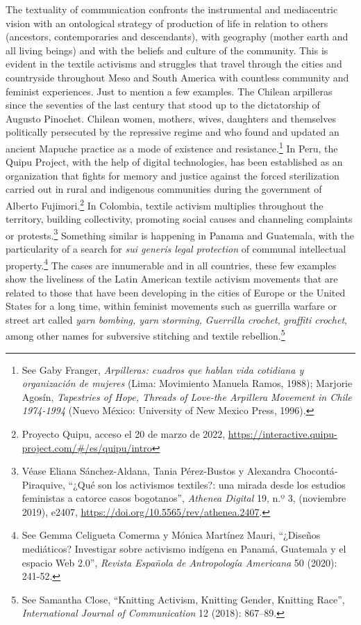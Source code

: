 \documentclass{tufte-handout}
\begin{document}
The textuality of communication confronts the instrumental and
mediacentric vision with an ontological strategy of production of life
in relation to others (ancestors, contemporaries and descendants), with
geography (mother earth and all living beings) and with the beliefs and
culture of the community. This is evident in the textile activisms and
struggles that travel through the cities and countryside throughout Meso
and South America with countless community and feminist experiences.
Just to mention a few examples. The Chilean arpilleras since the
seventies of the last century that stood up to the dictatorship of
Augusto Pinochet. Chilean women, mothers, wives, daughters and
themselves politically persecuted by the repressive regime and who found
and updated an ancient Mapuche practice as a mode of existence and
resistance.\footnote{See Gaby Franger, \emph{Arpilleras: cuadros que
  hablan vida cotidiana y organización de mujeres} (Lima: Movimiento
  Manuela Ramos, 1988); Marjorie Agosín, \emph{Tapestries of Hope,
  Threads of Love-the Arpillera Movement in Chile 1974-1994} (Nuevo
  México: University of New Mexico Press, 1996).} In Peru, the Quipu
Project, with the help of digital technologies, has been established as
an organization that fights for memory and justice against the forced
sterilization carried out in rural and indigenous communities during the
government of Alberto Fujimori.\footnote{Proyecto Quipu, acceso el 20 de
  marzo de 2022,
  \url{https://interactive.quipu-project.com/\#/es/quipu/intro}} In
Colombia, textile activism multiplies throughout the territory, building
collectivity, promoting social causes and channeling complaints or
protests.\footnote{Véase Eliana Sánchez-Aldana, Tania Pérez-Bustos y
  Alexandra Chocontá-Piraquive, ``¿Qué son los activismos textiles?: una
  mirada desde los estudios feministas a catorce casos bogotanos'',
  \emph{Athenea Digital} 19, n.º 3, (noviembre 2019), e2407,
  \url{https://doi.org/10.5565/rev/athenea.2407}.} Something similar is
happening in Panama and Guatemala, with the particularity of a search
for \emph{sui generis legal protection} of communal intellectual
property.\footnote{See Gemma Celigueta Comerma y Mónica Martínez Mauri,
  ``¿Diseños mediáticos? Investigar sobre activismo indígena en Panamá,
  Guatemala y el espacio Web 2.0'', \emph{Revista Española de
  Antropología Americana} 50 (2020): 241-52.} The cases are innumerable
and in all countries, these few examples show the liveliness of the
Latin American textile activism movements that are related to those that
have been developing in the cities of Europe or the United States for a
long time, within feminist movements such as guerrilla warfare or street
art called \emph{yarn} \emph{bombing, yarn storming,} \emph{Guerrilla
crochet}, \emph{graffiti crochet}, among other names for subversive
stitching and textile rebellion.\footnote{See Samantha Close, ``Knitting
  Activism, Knitting Gender, Knitting Race'', \emph{International
  Journal of Communication} 12 (2018): 867--89.}
\end{document}
